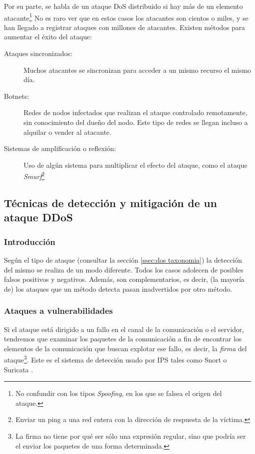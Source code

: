 Por su parte, se habla de un ataque \gls{DoS} distribuido si hay más de un elemento 
atacante\footnote{No confundir con los tipos \emph{Spoofing}, en los que se falsea el origen del ataque.} 
No es raro ver que en estos casos los atacantes son cientos o miles, y se han llegado a registrar ataques 
con millones de atacantes. Existen métodos para aumentar el éxito del ataque:
\begin{description}
  \item[Ataques sincronizados:] Muchos atacantes se sincronizan para acceder a un mismo recurso el
  mismo día.
  \item[Botnets:] Redes de nodos infectados que realizan el ataque controlado remotamente, sin conocimiento del
  dueño del nodo. Este tipo de redes se llegan incluso a alquilar o vender al atacante.
  \item[Sistemas de amplificación o reflexión:] Uso de algún sistema para multiplicar el efecto del ataque,
  como el ataque \emph{Smurf}\footnote{Enviar un ping a una red entera con la dirección de respuesta 
  de la víctima.}
\end{description}

\subsection{Técnicas de detección y mitigación de un ataque DDoS}\label{sec:dos Deteccion y mitigación}
\subsubsection{Introducción}
Según el tipo de ataque (consultar la sección \ref{ssec:dos taxonomia}) la detección del mismo se realiza de un modo diferente.
Todos los casos adolecen de posibles falsos positivos y negativos. Además, son complementarios, es decir, (la mayoría de) los
ataques que un método detecta pasan inadvertidos por otro método.

\subsubsection{Ataques a vulnerabilidades}
Si el ataque está dirigido a un fallo en el canal de la comunicación o el servidor,
tendremos que examinar los paquetes de la comunicación a fin de encontrar los elementos de la
comunicación que buscan explotar ese fallo, es decir, la \emph{firma} del ataque\footnote{La firma no tiene
por qué ser sólo una expresión regular, sino que podría ser el enviar los paquetes de una forma determinada.}.
Este es el sistema de detección usado por IPS tales como Snort \cite{snort} o Suricata \cite{suricata}.

